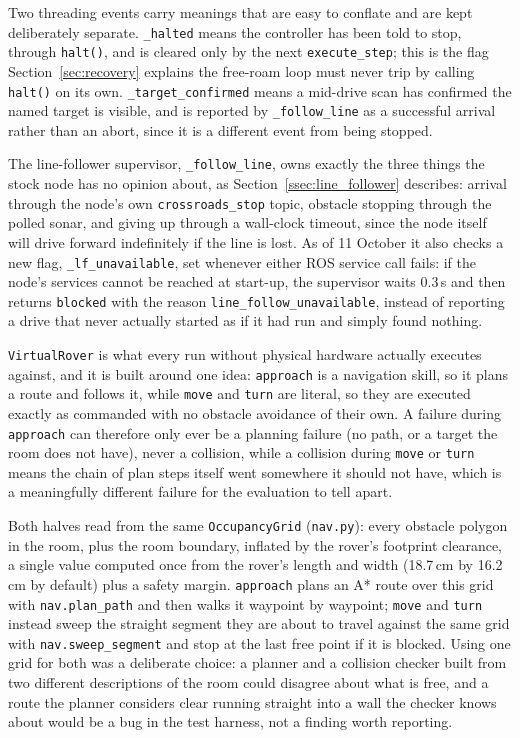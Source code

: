 Two threading events carry meanings that are easy to conflate and are kept
deliberately separate. \texttt{\_halted} means the controller has been told to
stop, through \texttt{halt()}, and is cleared only by the next
\texttt{execute\_step}; this is the flag Section~\ref{sec:recovery} explains the
free-roam loop must never trip by calling \texttt{halt()} on its own.
\texttt{\_target\_confirmed} means a mid-drive scan has confirmed the named
target is visible, and is reported by \texttt{\_follow\_line} as a successful
arrival rather than an abort, since it is a different event from being stopped.

The line-follower supervisor, \texttt{\_follow\_line}, owns exactly the three
things the stock node has no opinion about, as Section~\ref{ssec:line_follower}
describes: arrival through the node's own \texttt{crossroads\_stop} topic,
obstacle stopping through the polled sonar, and giving up through a wall-clock
timeout, since the node itself will drive forward indefinitely if the line is
lost. As of 11 October it also checks a new flag, \texttt{\_lf\_unavailable},
set whenever either ROS service call fails: if the node's services cannot be
reached at start-up, the supervisor waits 0.3\,s and then returns \texttt{blocked}
with the reason \texttt{line\_follow\_unavailable}, instead of reporting a drive
that never actually started as if it had run and simply found nothing.

\label{ssec:virtual_rover}

\texttt{VirtualRover} is what every run without physical hardware actually
executes against, and it is built around one idea: \texttt{approach} is a
navigation skill, so it plans a route and follows it, while \texttt{move} and
\texttt{turn} are literal, so they are executed exactly as commanded with no
obstacle avoidance of their own. A failure during \texttt{approach} can
therefore only ever be a planning failure (no path, or a target the room does
not have), never a collision, while a collision during \texttt{move} or
\texttt{turn} means the chain of plan steps itself went somewhere it should
not have, which is a meaningfully different failure for the evaluation to
tell apart.

Both halves read from the same \texttt{OccupancyGrid}
(\texttt{nav.py}): every obstacle polygon in the room, plus the room boundary,
inflated by the rover's footprint clearance, a single value computed once from
the rover's length and width (18.7\,cm by 16.2\,cm by default) plus a safety
margin. \texttt{approach} plans an A* route over this grid with
\texttt{nav.plan\_path} and then walks it waypoint by waypoint; \texttt{move}
and \texttt{turn} instead sweep the straight segment they are about to travel
against the same grid with \texttt{nav.sweep\_segment} and stop at the last
free point if it is blocked. Using one grid for both was a deliberate choice:
a planner and a collision checker built from two different descriptions of the
room could disagree about what is free, and a route the planner considers
clear running straight into a wall the checker knows about would be a bug in
the test harness, not a finding worth reporting.

